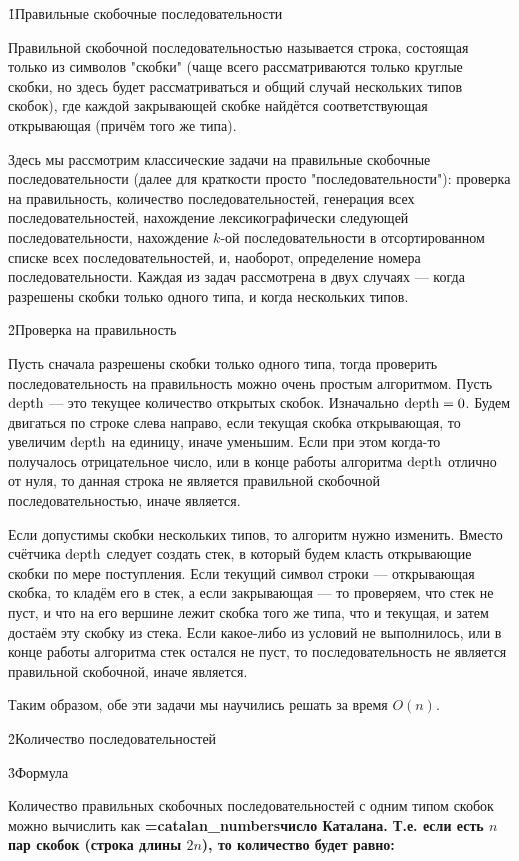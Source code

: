 \h1{Правильные скобочные последовательности}

Правильной скобочной последовательностью называется строка, состоящая только из символов "скобки" (чаще всего рассматриваются только круглые скобки, но здесь будет рассматриваться и общий случай нескольких типов скобок), где каждой закрывающей скобке найдётся соответствующая открывающая (причём того же типа).

Здесь мы рассмотрим классические задачи на правильные скобочные последовательности (далее для краткости просто "последовательности"): проверка на правильность, количество последовательностей, генерация всех последовательностей, нахождение лексикографически следующей последовательности, нахождение $k$-ой последовательности в отсортированном списке всех последовательностей, и, наоборот, определение номера последовательности. Каждая из задач рассмотрена в двух случаях --- когда разрешены скобки только одного типа, и когда нескольких типов.


\h2{Проверка на правильность}

Пусть сначала разрешены скобки только одного типа, тогда проверить последовательность на правильность можно очень простым алгоритмом. Пусть $\rm depth$ --- это текущее количество открытых скобок. Изначально $\rm depth = 0$. Будем двигаться по строке слева направо, если текущая скобка открывающая, то увеличим $\rm depth$ на единицу, иначе уменьшим. Если при этом когда-то получалось отрицательное число, или в конце работы алгоритма $\rm depth$ отлично от нуля, то данная строка не является правильной скобочной последовательностью, иначе является.

Если допустимы скобки нескольких типов, то алгоритм нужно изменить. Вместо счётчика $\rm depth$ следует создать стек, в который будем класть открывающие скобки по мере поступления. Если текущий символ строки --- открывающая скобка, то кладём его в стек, а если закрывающая --- то проверяем, что стек не пуст, и что на его вершине лежит скобка того же типа, что и текущая, и затем достаём эту скобку из стека. Если какое-либо из условий не выполнилось, или в конце работы алгоритма стек остался не пуст, то последовательность не является правильной скобочной, иначе является.

Таким образом, обе эти задачи мы научились решать за время $O(n)$.


\h2{Количество последовательностей}

\h3{Формула}

Количество правильных скобочных последовательностей с одним типом скобок можно вычислить как \bf{\algohref=catalan_numbers{число Каталана}}. Т.е. если есть $n$ пар скобок (строка длины $2n$), то количество будет равно:

